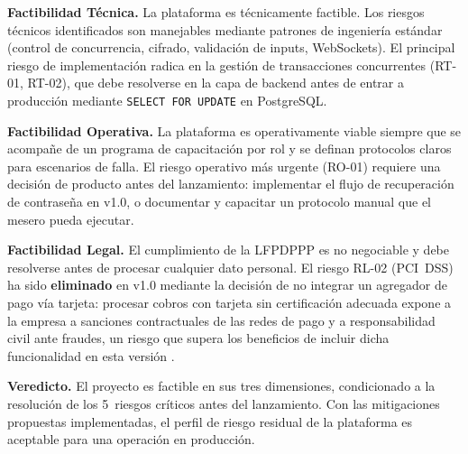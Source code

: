 \noindent\textbf{Factibilidad T\'ecnica.}
La plataforma es t\'ecnicamente factible. Los riesgos t\'ecnicos identificados son manejables
mediante patrones de ingenier\'ia est\'andar (control de concurrencia, cifrado, validaci\'on
de inputs, WebSockets). El principal riesgo de implementaci\'on radica en la gesti\'on de
transacciones concurrentes (RT-01, RT-02), que debe resolverse en la capa de backend antes
de entrar a producci\'on mediante \texttt{SELECT FOR UPDATE} en PostgreSQL.

\noindent\textbf{Factibilidad Operativa.}
La plataforma es operativamente viable siempre que se acompa\~ne de un programa de
capacitaci\'on por rol y se definan protocolos claros para escenarios de falla. El riesgo
operativo m\'as urgente (RO-01) requiere una decisi\'on de producto antes del lanzamiento:
implementar el flujo de recuperaci\'on de contrase\~na en v1.0, o documentar y capacitar
un protocolo manual que el mesero pueda ejecutar.

\noindent\textbf{Factibilidad Legal.}
El cumplimiento de la LFPDPPP es no negociable y debe resolverse antes de procesar
cualquier dato personal. El riesgo RL-02 (PCI~DSS) ha sido \textbf{eliminado} en v1.0
mediante la decisi\'on de no integrar un agregador de pago v\'ia tarjeta: procesar cobros
con tarjeta sin certificaci\'on adecuada expone a la empresa a sanciones contractuales de
las redes de pago y a responsabilidad civil ante fraudes, un riesgo que supera los
beneficios de incluir dicha funcionalidad en esta versi\'on \cite{conasami_2024}.

\noindent\textbf{Veredicto.}
El proyecto es factible en sus tres dimensiones, condicionado a la resoluci\'on de los
5~riesgos cr\'iticos antes del lanzamiento. Con las mitigaciones propuestas implementadas,
el perfil de riesgo residual de la plataforma es aceptable para una operaci\'on en producci\'on.

\newpage
